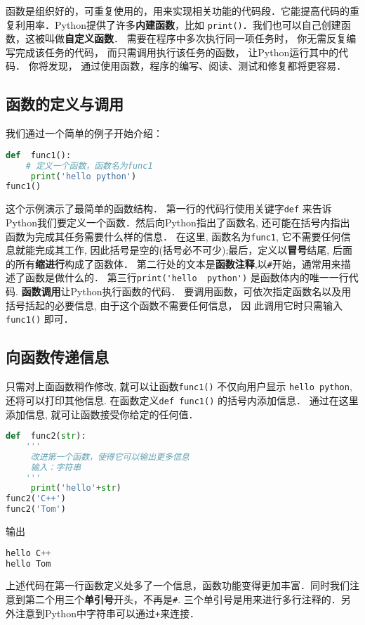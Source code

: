 
函数是组织好的，可重复使用的，用来实现相关功能的代码段．它能提高代码的重复利用率．Python提供了许多\textbf{内建函数}，比如 \verb|print()|．我们也可以自己创建函数，这被叫做\textbf{自定义函数}． 需要在程序中多次执行同一项任务时， 你无需反复编写完成该任务的代码， 而只需调用执行该任务的函数， 让Python运行其中的代码． 你将发现， 通过使用函数，程序的编写、阅读、测试和修复都将更容易．

\subsection{函数的定义与调用}
我们通过一个简单的例子开始介绍：
\begin{lstlisting}[language=python]
def  func1():
    # 定义一个函数，函数名为func1
     print('hello python')
func1()
\end{lstlisting}
这个示例演示了最简单的函数结构． 第一行的代码行使用关键字\verb|def| 来告诉Python我们要定义一个函数．然后向Python指出了函数名, 还可能在括号内指出函数为完成其任务需要什么样的信息． 在这里, 函数名为\verb|func1|, 它不需要任何信息就能完成其工作, 因此括号是空的(括号必不可少);最后，定义以\textbf{冒号}结尾, 后面的所有\textbf{缩进行}构成了函数体． 第二行处的文本是\textbf{函数注释},以\verb|#|开始，通常用来描述了函数是做什么的．
第三行\verb|print('hello  python')| 是函数体内的唯一一行代码.
\textbf{函数调用}让Python执行函数的代码． 要调用函数，可依次指定函数名以及用括号括起的必要信息, 由于这个函数不需要任何信息， 因
此调用它时只需输入\verb|func1()| 即可．
\subsection{向函数传递信息}
只需对上面函数稍作修改, 就可以让函数\verb|func1()| 不仅向用户显示 \verb|hello python|, 还将可以打印其他信息. 在函数定义\verb|def func1()| 的括号内添加信息． 通过在这里添加信息, 就可让函数接受你给定的任何值．
\begin{lstlisting}[language=python]
def  func2(str):
    '''
     改进第一个函数，使得它可以输出更多信息
     输入：字符串
    '''
     print('hello'+str)
func2('C++')
func2('Tom')
\end{lstlisting}
输出
\begin{lstlisting}[language=python]
hello C++
hello Tom
\end{lstlisting}
上述代码在第一行函数定义处多了一个信息，函数功能变得更加丰富．同时我们注意到第二个用三个\textbf{单引号}开头，不再是\verb|#|. 三个单引号是用来进行多行注释的．另外注意到Python中字符串可以通过\verb|+|来连接．

